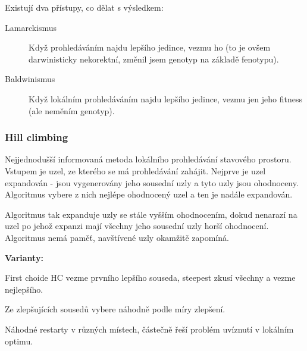 Existují dva přístupy, co dělat s výsledkem:
\begin{description}
	\item[Lamarckismus] Když prohledáváním najdu lepšího jedince, vezmu ho (to je ovšem darwinisticky nekorektní, změnil jsem genotyp na základě fenotypu).
	\item[Baldwinismus] Když lokálním prohledáváním najdu lepšího jedince, vezmu jen jeho fitness (ale neměním genotyp).
\end{description}


\subsubsection{Hill climbing}
Nejjednodušší informovaná metoda lokálního prohledávání stavového prostoru. Vstupem je uzel, ze kterého se má prohledávání zahájit. Nejprve je uzel expandován - jsou vygenerovány jeho sousední uzly a tyto uzly jsou ohodnoceny. Algoritmus vybere z nich nejlépe ohodnocený uzel a ten je nadále expandován. 

Algoritmus tak expanduje uzly se stále vyšším ohodnocením, dokud nenarazí na uzel po jehož expanzi mají všechny jeho sousední uzly horší ohodnocení. Algoritmus nemá paměť, navštívené uzly okamžitě zapomíná.

\medskip\textbf{Varianty:}
\begin{description}
	\leftskip 30pt
	
	\item[first choice HC vs. steepest ascent HC] First choide HC vezme prvního lepšího souseda, steepest zkusí všechny a vezme nejlepšího.
	\item[stochastic HC] Ze zlepšujících sousedů vybere náhodně podle míry zlepšení.
	\item[random restart HC (or shotgun HC)] Náhodné restarty v různých místech, částečně řeší problém uvíznutí v lokálním optimu.
\end{description}


